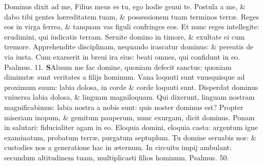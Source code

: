 \documentclass[a5paper,10pt]{book}
\def\ae{æ}
\begin{document}
\begin{multicols*}{2}
\newline \color{red} D\color{black}ominus dixit ad me, Filius meus es tu, ego hodie genui te.
\newline \color{red} P\color{black}ostula a me, \& dabo tibi gentes h\ae reditatem tuam, \& possessionem tuam terminos terr\ae .
\newline \color{red} R\color{black}eges eos in virga ferrea, \& tanquam vas figuli confringes eos.
\newline \color{red} E\color{black}t nunc reges intellegite: erudimini, qui iudicatis terram.
\newline \color{red} S\color{black}eruite domino in timore, \& exultate ei cum tremore.
\newline \color{red} A\color{black}pprehendite disciplinam, nequando irascatur dominus: \& pereatis de via iusta.
\newline \color{red} C\color{black}um exarserit in breui ira eius: beati omnes, qui confidunt in eo.
\newline \color{red} Psalmus. \hypertarget{ps11}{11.} \color{black}
\vspace{-.25em}
\lettrine[lines=2]{\bfseries \color{red} S}{}Aluum me fac domine, quoniam defecit sanctus: quoniam diminut\ae \ sunt veritates a filijs hominum.
\newline \color{red} V\color{black}ana loquuti sunt vnusquisque ad proximum suum: labia dolosa, in corde \& corde loquuti sunt.
\newline \color{red} D\color{black}isperdat dominus vniuersa labia dolosa, \& linguam magniloquam.
\newline \color{red} Q\color{black}ui dixerunt, linguam nostram magnificabimus: labia nostra a nobis sunt: quis noster dominus est?
\newline \color{red} P\color{black}ropter miseriam inopum, \& gemitum pauperum, nunc exurgam, dicit dominus.
\newline \color{red} P\color{black}onam in salutari: fiducialiter agam in eo.
\newline \color{red} E\color{black}loquia domini, eloquia casta: argentum igne examinatum, probatum terr\ae , purgatum septuplum.
\newline \color{red} T\color{black}u domine seruabis nos: \& custodies nos a generatione hac in \ae ternum.
\newline \color{red} I\color{black}n circuitu impij ambulant: secundum altitudinem tuam, multiplicasti filios hominum. \quad \color{red} Psalmus. \hypertarget{ps50}{50.} \color{black}
\vspace{-.5em}

\end{multicols*}
\end{document}
